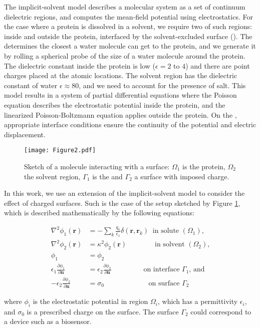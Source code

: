 
The implicit-solvent model describes a molecular system as a set of continuum dielectric regions, and computes the mean-field potential using electrostatics. 
For the case where a protein is dissolved in a solvent, we require two of such regions: inside and outside the protein, interfaced by the solvent-excluded surface (\ses). 
The \ses determines the closest a water molecule can get to the protein, and we generate it by rolling a spherical probe of the size of a water molecule around the protein. 
The dielectric constant inside the protein is low ($\epsilon= 2\text{ to }4$) and there are point charges  placed at the atomic locations. The solvent region has the dielectric constant of water $\epsilon \approx 80$, and we need to account for the presence of salt. 
This model results in a system of partial differential equations where the Poisson equation describes the electrostatic potential inside the protein, and the linearized Poisson-Boltzmann equation applies outside the protein. On the \ses, appropriate interface conditions ensure the continuity of the potential and electric displacement.


\begin{figure}[h]
   \texttt{[image: Figure2.pdf]} 
   \caption{Sketch of a molecule interacting with a surface: $\Omega_1$ is the protein, $\Omega_2$ the solvent region, $\Gamma_1$ is the  \ses and $\Gamma_2$ a surface with imposed charge.}
   \label{fig:molecule_surface}
\end{figure}

In this work, we use an extension of the implicit-solvent model to consider the effect of charged surfaces. Such is the case of the setup sketched by Figure \ref{fig:molecule_surface}, which is described mathematically by the following equations:


\begin{align} \label{eq:pde}
\nabla^2 \phi_1(\mathbf{r}) &= - \sum_k \frac{q_k}{\epsilon_1} \delta(\mathbf{r},\mathbf{r}_k) \ \text{ in solute $(\Omega_1)$,}  \nonumber \\ 
\nabla^2\phi_2 (\mathbf{r}) &= \kappa^2 \phi_2(\mathbf{r}) \quad \qquad \ \ \ \text{ in solvent $(\Omega_2)$,}  \nonumber \\ 
\phi_1 &=\phi_2 \nonumber \\ 
\epsilon_1 \frac{\partial \phi_1}{\partial \mathbf{n}} &= \epsilon_2 \frac{\partial \phi_2}{\partial \mathbf{n}}  \ \qquad \qquad \text{ on interface $\Gamma_1$, and} \nonumber \\
-\epsilon_2 \frac{\partial \phi_2}{\partial \mathbf{n}} &= \sigma_0 \qquad \qquad \qquad \text{ on surface $\Gamma_2$} 
\end{align}

\noindent where $\phi_i$ is the electrostatic potential in region $\Omega_i$, which has a permittivity $\epsilon_i$, and $\sigma_0$ is a prescribed charge on the surface. The surface $\Gamma_2$ could correspond to a device such as a biosensor.

